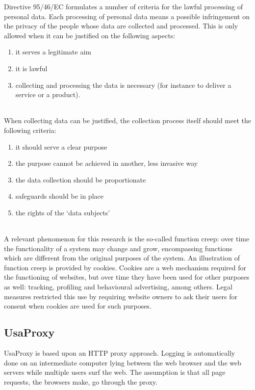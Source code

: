 Directive 95/46/EC formulates a number of criteria for the lawful processing of personal data. Each processing of personal data means a possible infringement on the privacy of the people whose data are collected and processed. This is only allowed when it can be justified on the following aspects:
\begin{enumerate}
	\item it serves a legitimate aim
	\item it is lawful
	\item collecting and processing the data is necessary (for instance to deliver a service or a product).
\end{enumerate}
~\\
When collecting data can be justified, the collection process itself should meet the following criteria:
\begin{enumerate}
	\item it should serve a clear purpose
	\item the purpose cannot be achieved in another, less invasive way 
	\item the data collection should be proportionate
	\item safeguards should be in place 
	\item the rights of the ‘data subjects’
\end{enumerate}
~\\
A relevant phenomenon for this research is the so-called function creep: over time the functionality of a system may change and grow, encompassing functions which are different from the original purposes of the system. An illustration of function creep is provided by cookies. Cookies are a web mechanism required for the functioning of websites, but over time they have been used for other purposes as well: tracking, profiling and behavioural advertising, among others. Legal measures restricted this use by requiring website owners to ask their users for consent when cookies are used for such purposes.

\subsection{UsaProxy}
UsaProxy \cite{wnuk2005usability}\cite{atterer2006logging}\cite{atterer2007tracking} is based upon an HTTP proxy approach. Logging is automatically done on an intermediate computer lying between the web browser and the web servers while multiple users surf the web. The assumption is that all page requests, the browsers make, go through the proxy.
	
